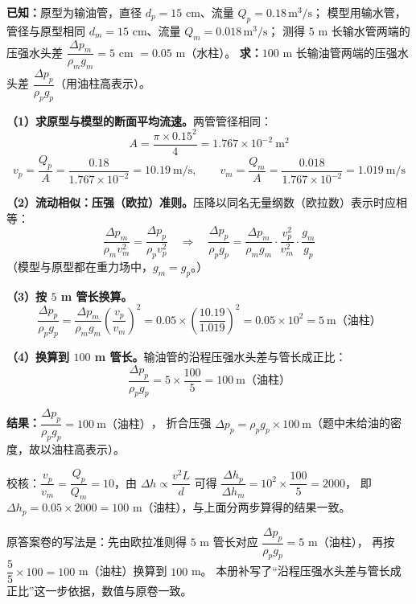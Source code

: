 \begin{jie}
\textbf{已知：}原型为输油管，直径 $d_p=15$ cm、流量 $Q_p=0.18\,\mathrm{m^{3}/s}$；
模型用输水管，管径与原型相同 $d_m=15$ cm、流量 $Q_m=0.018\,\mathrm{m^{3}/s}$；
测得 $5$ m 长输水管两端的压强水头差 $\dfrac{\Delta p_m}{\rho_mg_m}=5$ cm $=0.05$ m（水柱）。
\textbf{求：}$100$ m 长输油管两端的压强水头差 $\dfrac{\Delta p_p}{\rho_pg_p}$（用油柱高表示）。

\textbf{（1）求原型与模型的断面平均流速。}两管管径相同：
\[
A=\frac{\pi\times0.15^{2}}{4}=1.767\times10^{-2}\ \mathrm{m^{2}}
\]
\[
v_p=\frac{Q_p}{A}=\frac{0.18}{1.767\times10^{-2}}=10.19\ \mathrm{m/s},
\qquad
v_m=\frac{Q_m}{A}=\frac{0.018}{1.767\times10^{-2}}=1.019\ \mathrm{m/s}
\]

\textbf{（2）流动相似：压强（欧拉）准则。}压降以同名无量纲数（欧拉数）表示时应相等：
\[
\frac{\Delta p_m}{\rho_mv_m^{2}}=\frac{\Delta p_p}{\rho_pv_p^{2}}
\quad\Longrightarrow\quad
\frac{\Delta p_p}{\rho_pg_p}
=\frac{\Delta p_m}{\rho_mg_m}\cdot\frac{v_p^{2}}{v_m^{2}}\cdot\frac{g_m}{g_p}
\]
（模型与原型都在重力场中，$g_m=g_p$。）

\textbf{（3）按 $5$ m 管长换算。}
\[
\frac{\Delta p_p}{\rho_pg_p}
=\frac{\Delta p_m}{\rho_mg_m}\left(\frac{v_p}{v_m}\right)^{2}
=0.05\times\left(\frac{10.19}{1.019}\right)^{2}
=0.05\times10^{2}=5\ \text{m（油柱）}
\]

\textbf{（4）换算到 $100$ m 管长。}输油管的沿程压强水头差与管长成正比：
\[
\frac{\Delta p_p}{\rho_pg_p}=5\times\frac{100}{5}=100\ \text{m（油柱）}
\]

\textbf{结果：}$\boxed{\dfrac{\Delta p_p}{\rho_pg_p}=100\ \text{m（油柱）}}$，
折合压强 $\Delta p_p=\rho_pg_p\times100\ \mathrm{m}$（题中未给油的密度，故以油柱高表示）。

校核：$\dfrac{v_p}{v_m}=\dfrac{Q_p}{Q_m}=10$，由 $\Delta h\propto\dfrac{v^{2}L}{d}$ 可得
$\dfrac{\Delta h_p}{\Delta h_m}=10^{2}\times\dfrac{100}{5}=2000$，
即 $\Delta h_p=0.05\times2000=100$ m（油柱），与上面分两步算得的结果一致。
\end{jie}

\begin{tishi}
原答案卷的写法是：先由欧拉准则得 $5$ m 管长对应 $\dfrac{\Delta p_p}{\rho_pg_p}=5$ m（油柱），
再按 $\dfrac{5}{5}\times100=100$ m（油柱）换算到 $100$ m。
本册补写了“沿程压强水头差与管长成正比”这一步依据，数值与原卷一致。
\end{tishi}


